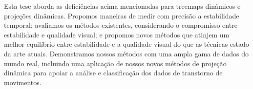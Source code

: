 Esta tese aborda as deficiências acima mencionadas para treemaps dinâmicos e projeções dinâmicas. Propomos maneiras de medir com precisão a estabilidade temporal; avaliamos os métodos existentes, considerando o compromisso entre estabilidade e qualidade visual; e propomos novos métodos que atinjem um melhor equilíbrio entre estabilidade e a qualidade visual do que as técnicas estado da arte atuais. Demonstramos nossos métodos com uma ampla gama de dados do mundo real, incluindo uma aplicação de nossos novos métodos de projeção dinâmica para apoiar a análise e classificação dos dados de transtorno de movimentos. 



\endgroup			
